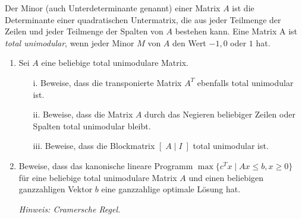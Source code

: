 \documentclass{uebung_cs}
\begin{document}
\begin{exercise}
	Der Minor (auch Unterdeterminante genannt) einer Matrix $A$ ist die Determinante einer quadratischen Untermatrix, die aus jeder Teilmenge der Zeilen und jeder Teilmenge der Spalten von $A$ bestehen kann. Eine Matrix A ist \emph{total unimodular}, wenn jeder Minor $M$ von $A$ den Wert $-1,0$ oder $1$ hat.
	\begin{enumerate}
		\item Sei $A$ eine beliebige total unimodulare Matrix.
		\begin{enumerate}
			\item[i.] Beweise, dass die transponierte Matrix $A^T$ ebenfalls total unimodular ist.
			\item[ii.] Beweise, dass die Matrix $A$ durch das Negieren beliebiger Zeilen oder Spalten total unimodular bleibt.
			\item[iii.] Beweise, dass die Blockmatrix $[\;A\;|\;I\;]$ total unimodular ist.
		\end{enumerate}
		\item Beweise, dass das kanonische lineare Programm $\max\{c^T x  \; | \; Ax \leq b, x \geq 0\}$ für eine beliebige total unimodulare Matrix $A$ und einen beliebigen ganzzahligen Vektor $b$ eine ganzzahlige optimale Lösung hat.

		\emph{Hinweis: Cramersche Regel.}
	\end{enumerate}
	
\end{exercise}
\end{document}
